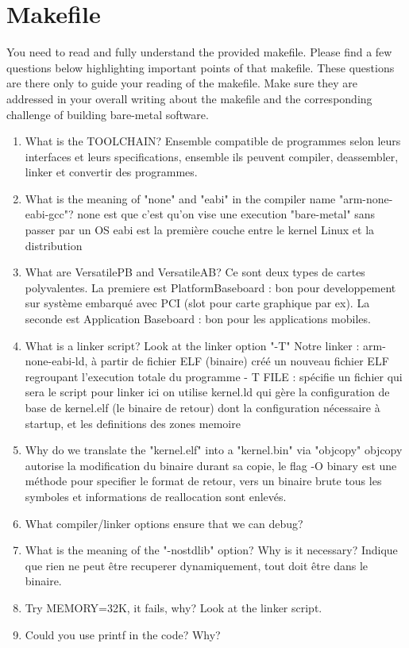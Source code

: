 \documentclass[10]{article}
\begin{document}
\section{Makefile}

You need to read and fully understand the provided makefile.
Please find a few questions below highlighting important points
of that makefile. These questions are there only to guide your
reading of the makefile. Make sure they are addressed in your
overall writing about the makefile and the corresponding challenge
of building bare-metal software.

\begin{enumerate}
\item 
  What is the TOOLCHAIN?
  Ensemble compatible de programmes selon leurs interfaces et leurs specifications, ensemble ils peuvent compiler, deassembler, linker et convertir des programmes.
\item
  What is the meaning of "none" and "eabi" in the compiler
  name "arm-none-eabi-gcc"?
  none est que c'est qu'on vise une execution "bare-metal" sans passer par un OS
  eabi est la première couche entre le kernel Linux et la distribution 
\item
  What are VersatilePB and VersatileAB?
  Ce sont deux types de cartes polyvalentes. La premiere est PlatformBaseboard : bon pour developpement sur système embarqué avec PCI (slot pour carte graphique par ex). La seconde est Application Baseboard : bon pour les applications mobiles.
\item
  What is a linker script? Look at the linker option "-T"
  Notre linker : arm-none-eabi-ld, à partir de fichier ELF (binaire) créé un nouveau fichier ELF regroupant l'execution totale du programme
  - T FILE : spécifie un fichier qui sera le script pour linker 
  ici on utilise kernel.ld qui gère la configuration de base de kernel.elf (le binaire de retour) dont la configuration nécessaire à startup, et les definitions des zones memoire
\item
  Why do we translate the "kernel.elf" into a "kernel.bin" via "objcopy"  
  objcopy autorise la modification du binaire durant sa copie, le flag -O binary est une méthode pour specifier le format de retour, vers un binaire brute tous les symboles et informations de reallocation sont enlevés.
\item
  What compiler/linker options ensure that we can debug?
\item
  What is the meaning of the "-nostdlib" option? Why is it necessary?
  Indique que rien ne peut être recuperer dynamiquement, tout doit être dans le binaire.
\item
  Try MEMORY=32K, it fails, why? Look at the linker script.
\item
  Could you use printf in the code? Why?
\end{enumerate}
\end{document}
